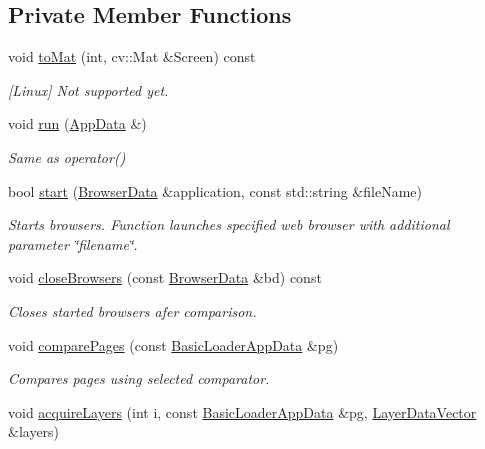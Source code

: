 \subsection*{Private Member Functions}
\begin{DoxyCompactItemize}
\item 
void \hyperlink{classwpc_1_1_basic_loader_a5d58596278a4f9ffc1100bae2a37b4a5}{to\-Mat} (int, cv\-::\-Mat \&Screen) const 
\begin{DoxyCompactList}\small\item\em \mbox{[}Linux\mbox{]} Not supported yet. \end{DoxyCompactList}\item 
void \hyperlink{classwpc_1_1_basic_loader_a715fa2e450294b3c8ada601d720bd236}{run} (\hyperlink{structwpc_1_1_app_data}{App\-Data} \&)
\begin{DoxyCompactList}\small\item\em Same as operator() \end{DoxyCompactList}\item 
bool \hyperlink{classwpc_1_1_basic_loader_a760546ee7fb17cf593401a15beb5a30e}{start} (\hyperlink{structwpc_1_1_browser_data}{Browser\-Data} \&application, const std\-::string \&file\-Name)
\begin{DoxyCompactList}\small\item\em Starts browsers. Function launches specified web browser with additional parameter \char`\"{}filename\char`\"{}. \end{DoxyCompactList}\item 
void \hyperlink{classwpc_1_1_basic_loader_ac562a2638ad95b3711f2ea63ba7719e4}{close\-Browsers} (const \hyperlink{structwpc_1_1_browser_data}{Browser\-Data} \&bd) const 
\begin{DoxyCompactList}\small\item\em Closes started browsers afer comparison. \end{DoxyCompactList}\item 
void \hyperlink{classwpc_1_1_basic_loader_a1197416ed7fda5cebe773ed9bc12d323}{compare\-Pages} (const \hyperlink{structwpc_1_1_basic_loader_app_data}{Basic\-Loader\-App\-Data} \&pg)
\begin{DoxyCompactList}\small\item\em Compares pages using selected comparator. \end{DoxyCompactList}\item 
void \hyperlink{classwpc_1_1_basic_loader_a4bd3ad5553e97dd14dcffec70d4696a7}{acquire\-Layers} (int i, const \hyperlink{structwpc_1_1_basic_loader_app_data}{Basic\-Loader\-App\-Data} \&pg, \hyperlink{namespacewpc_a778a3f9b2be5b4dd228ea2c752dc7aa2}{Layer\-Data\-Vector} \&layers)

\end{DoxyCompactItemize}
